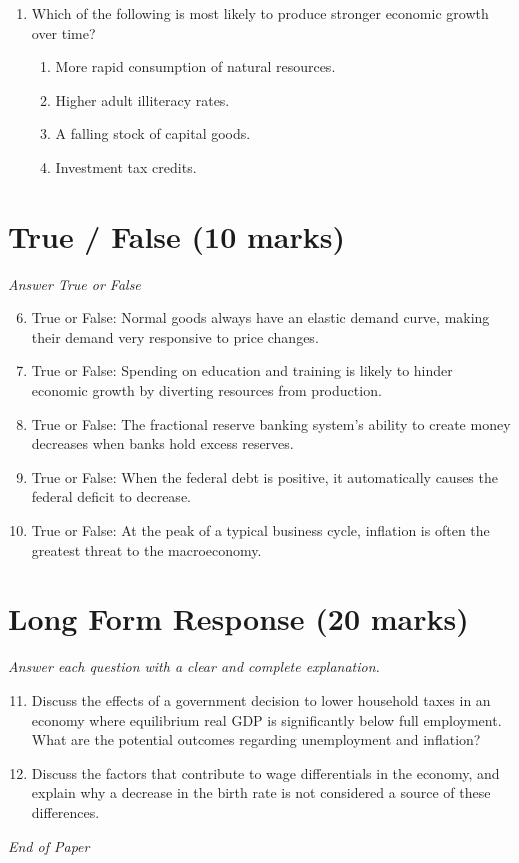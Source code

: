 \documentclass[12pt]{article}
\begin{document}
\begin{enumerate}[label=\arabic*.]
\begin{enumerate}[label=(\alph*)]
    \item money.
    \item plant and equipment.
    \item where the central government is located.
    \item the center of the economy.
\end{enumerate}
\item Which of the following is most likely to produce stronger economic growth over time?
\begin{enumerate}[label=(\alph*)]
    \item More rapid consumption of natural resources.
    \item Higher adult illiteracy rates.
    \item A falling stock of capital goods.
    \item Investment tax credits.
\end{enumerate}
\end{enumerate}

\section*{True / False (10 marks)}
\textit{Answer True or False}
\begin{enumerate}[label=\arabic*.]
\setcounter{enumi}{5}
\item True or False: Normal goods always have an elastic demand curve, making their demand very responsive to price changes.
\item True or False: Spending on education and training is likely to hinder economic growth by diverting resources from production.
\item True or False: The fractional reserve banking system's ability to create money decreases when banks hold excess reserves.
\item True or False: When the federal debt is positive, it automatically causes the federal deficit to decrease.
\item True or False: At the peak of a typical business cycle, inflation is often the greatest threat to the macroeconomy.
\end{enumerate}

\section*{Long Form Response (20 marks)}
\textit{Answer each question with a clear and complete explanation.}
\begin{enumerate}[label=\arabic*.]
\setcounter{enumi}{10}
\item Discuss the effects of a government decision to lower household taxes in an economy where
equilibrium real GDP is significantly below full employment. What are the potential
outcomes regarding unemployment and inflation?
\item Discuss the factors that contribute to wage differentials in the economy, and explain why
a decrease in the birth rate is not considered a source of these differences.
\end{enumerate}

\vfill
\noindent\textit{End of Paper}
\end{document}
